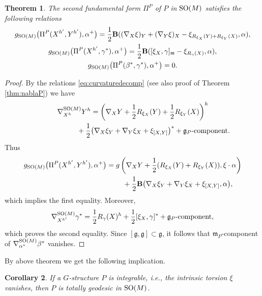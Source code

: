 \documentclass[10pt,a4paper]{amsart}
\numberwithin{equation}{section}
\newtheorem{Theorem}{Theorem}[section]
\newtheorem{Corollary}[Theorem]{Corollary}
\begin{document}
\begin{Theorem}\label{thm:secfundformP}
The second fundamental form $\Pi^P$ of $P$ in ${\rm SO}(M)$ satisfies the following relations
\begin{gather*}
g_{{\rm SO}(M)}\big(\Pi^P(X^{h'},Y^{h'}),\alpha^{+}\big) =\frac{1}{2}{\bf B}((\nabla_X\xi)_Y+(\nabla_Y\xi)_X-\xi_{R_{\xi_X}(Y)+R_{\xi_Y}(X)},\alpha),\\
g_{{\rm SO}(M)}\big(\Pi^P(X^{h'},\gamma^{\ast}),\alpha^{+}\big) =\frac{1}{2}{\bf B}([\xi_X,\gamma]_{\mathfrak{m}}-\xi_{R_{\gamma}(X)},\alpha),\\
g_{{\rm SO}(M)}\big(\Pi^P(\beta^{\ast},\gamma^{\ast}),\alpha^{+}\big)=0.
\end{gather*}
\end{Theorem}
\begin{proof}
By the relations \eqref{eq:curvaturedecomp} (see also proof of Theorem \ref{thm:nablaP}) we have
\begin{gather*}
\nabla^{{\rm SO}(M)}_{X^h}Y^h  =\left( \nabla_XY+\frac{1}{2}R_{\xi_X}(Y)+\frac{1}{2}R_{\xi_Y}(X) \right)^h\\
\hphantom{\nabla^{{\rm SO}(M)}_{X^h}Y^h  =}{} +\frac{1}{2}\big( \nabla_X\xi_Y+\nabla_Y\xi_X+\xi_{[X,Y]} \big)^{\ast}+\textrm{$\mathfrak{g}_P$-component}.
\end{gather*}
Thus
\begin{gather*}
g_{{\rm SO}(M)}\big(\Pi^P(X^{h'},Y^{h'}),\alpha^{+}\big) =g\left(\nabla_XY+\frac{1}{2}(R_{\xi_X}(Y)+R_{\xi_Y}(X)),\xi\cdot\alpha\right)\\
\hphantom{g_{{\rm SO}(M)}\big(\Pi^P(X^{h'},Y^{h'}),\alpha^{+}\big) =}{}
+\frac{1}{2}{\bf B}\big(\nabla_X\xi_Y+\nabla_Y\xi_X+\xi_{[X,Y]},\alpha\big),
\end{gather*}
which implies the f\/irst equality. Moreover,
\begin{gather*}
\nabla^{{\rm SO}(M)}_{X^{h'}}\gamma^{\ast}=\frac{1}{2}R_{\gamma}(X)^h+
\frac{1}{2}[\xi_X,\gamma]^{\ast}+\textrm{$\mathfrak{g}_P$-component},
\end{gather*}
which proves the second equality. Since $[\mathfrak{g},\mathfrak{g}]\subset\mathfrak{g}$, it follows that $\mathfrak{m}_P$-component of $\nabla^{{\rm SO}(M)}_{\alpha^{\ast}}\beta^{\ast}$ vanishes.
\end{proof}

By above theorem we get the following implication.

\begin{Corollary}\label{cor:totgeodP}
If a $G$-structure $P$ is integrable, i.e., the intrinsic torsion $\xi$ vanishes, then $P$ is totally geodesic in ${\rm SO}(M)$.
\end{Corollary}
\end{document}

